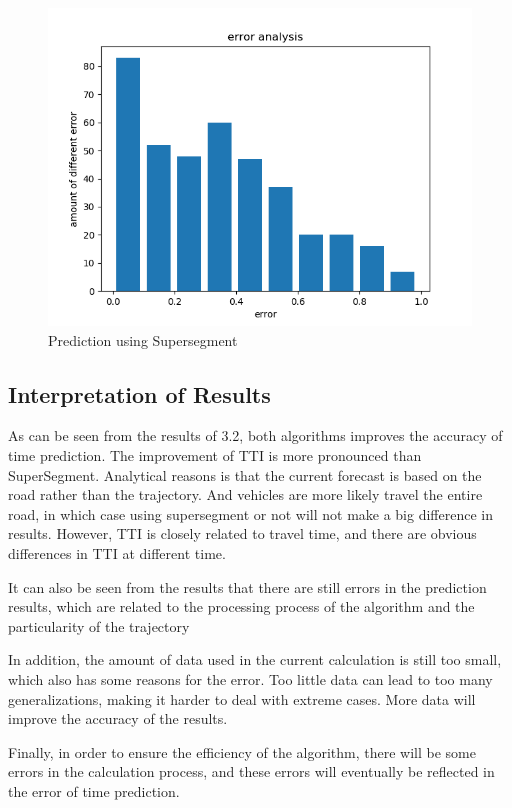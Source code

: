 \documentclass[fontset=none]{ctexart}
\theoremstyle{definition}
\theoremstyle{remark}
\begin{document}
\begin{figure}[htb]
  \centering
  \includegraphics[width=\textwidth]{images/error3.png}
  \caption{Prediction using Supersegment}
  \label{error3}
\end{figure}

\clearpage
\subsection{Interpretation of Results}
As can be seen from the results of 3.2, both algorithms improves the accuracy of time prediction. The improvement of TTI is more pronounced than SuperSegment. Analytical reasons is that the current forecast is based on the road rather than the trajectory. And vehicles are more likely travel the entire road, in which case using supersegment or not will not make a big difference in results. However, TTI is closely related to travel time, and there are obvious differences in TTI at different time.

It can also be seen from the results that there are still errors in the prediction results, which are related to the processing process of the algorithm and the particularity of the trajectory

In addition, the amount of data used in the current calculation is still too small, which also has some reasons for the error. Too little data can lead to too many generalizations, making it harder to deal with extreme cases. More data will improve the accuracy of the results.

Finally, in order to ensure the efficiency of the algorithm, there will be some errors in the calculation process, and these errors will eventually be reflected in the error of time prediction.
\end{document}
